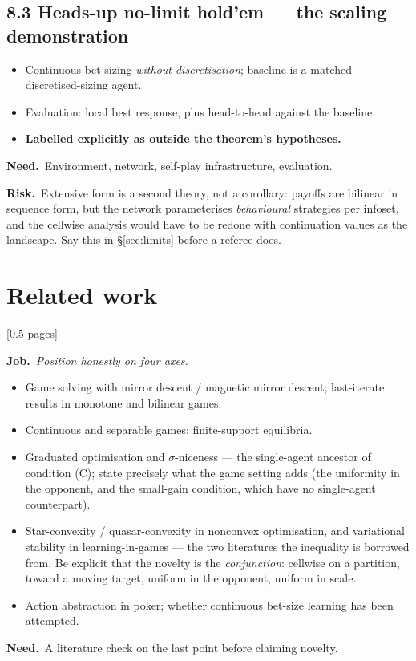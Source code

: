 \documentclass[11pt]{article}
\newcommand{\job}[1]{\par\smallskip\noindent
  \textcolor{jobc}{\textbf{Job.}}\ \emph{#1}\par\smallskip}
\newcommand{\need}[1]{\par\noindent
  \textcolor{needc}{\textbf{Need.}}\ #1\par}
\newcommand{\risk}[1]{\par\noindent
  \textcolor{riskc}{\textbf{Risk.}}\ #1\par\smallskip}
\newcommand{\budget}[1]{\hfill{\small\textsf{[#1]}}}
\theoremstyle{definition}
\theoremstyle{remark}
\begin{document}
\subsection*{8.3 Heads-up no-limit hold'em --- the scaling demonstration}
\begin{itemize}[leftmargin=1.2em]
\item Continuous bet sizing \emph{without discretisation}; baseline is a matched
  discretised-sizing agent.
\item Evaluation: local best response, plus head-to-head against the baseline.
\item \textbf{Labelled explicitly as outside the theorem's hypotheses.}
\end{itemize}
\need{Environment, network, self-play infrastructure, evaluation.}
\risk{Extensive form is a second theory, not a corollary: payoffs are bilinear in
sequence form, but the network parameterises \emph{behavioural} strategies per
infoset, and the cellwise analysis would have to be redone with continuation
values as the landscape. Say this in \S\ref{sec:limits} before a referee does.}

\section{Related work}\label{sec:related}
\budget{0.5 pages}

\job{Position honestly on four axes.}
\begin{itemize}[leftmargin=1.2em]
\item Game solving with mirror descent / magnetic mirror descent; last-iterate
  results in monotone and bilinear games.
\item Continuous and separable games; finite-support equilibria.
\item Graduated optimisation and $\sigma$-niceness --- the single-agent ancestor of
  condition (C); state precisely what the game setting adds (the uniformity in
  the opponent, and the small-gain condition, which have no single-agent
  counterpart).
\item Star-convexity / quasar-convexity in nonconvex optimisation, and
  variational stability in learning-in-games --- the two literatures the
  inequality is borrowed from. Be explicit that the novelty is the
  \emph{conjunction}: cellwise on a partition, toward a moving target, uniform in
  the opponent, uniform in scale.
\item Action abstraction in poker; whether continuous bet-size learning has been
  attempted.
\end{itemize}
\need{A literature check on the last point before claiming novelty.}
\end{document}
